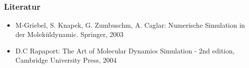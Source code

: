 \documentclass[compress]{beamer}
\begin{document}
\subsection{}
\begin{frame}
	\frametitle{Literatur}
	\begin{itemize}
        \item M-Griebel, S. Knapek, G. Zumbuschm, A. Caglar: Numerische Simulation in der Moleküldynamic. Springer, 2003
		\item D.C Rapaport: The Art of Molecular Dynamics Simulation - 2nd edition, Cambridge University Press, 2004
	\end{itemize}
\end{frame}
\end{document}
